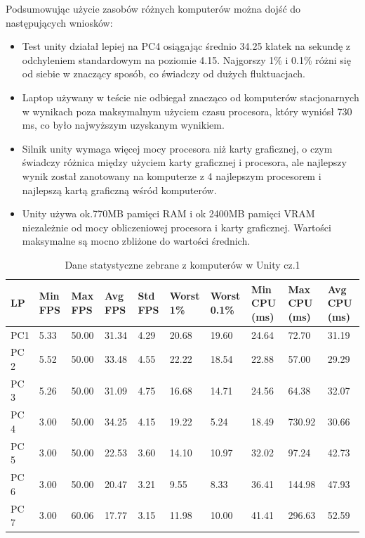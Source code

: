 \documentclass[12pt,twoside]{article}
\begin{document}
Podsumowując użycie zasobów różnych komputerów można dojść do następujących
wniosków:
\begin{itemize}
\item Test unity działał lepiej na PC4 osiągając średnio 34.25 klatek na sekundę
z odchyleniem standardowym  na poziomie 4.15. Najgorszy 1\% i 0.1\% różni się od
siebie w znaczący sposób, co świadczy od dużych fluktuacjach. 

\item Laptop używany w teście nie odbiegał znacząco od komputerów stacjonarnych
w wynikach poza maksymalnym użyciem czasu procesora, który wyniósł 730 ms, co
było najwyższym uzyskanym wynikiem. 

\item Silnik unity wymaga więcej mocy procesora niż karty graficznej, o czym
świadczy różnica między użyciem karty graficznej i procesora, ale najlepszy
wynik został zanotowany na komputerze z 4 najlepszym procesorem i najlepszą
kartą graficzną wśród komputerów. 

\item Unity używa ok.770MB pamięci RAM i ok 2400MB pamięci VRAM niezależnie od
mocy obliczeniowej procesora i karty graficznej. Wartości maksymalne są mocno
zbliżone do wartości średnich. 
\end{itemize}





\begin{table}[ht]
    \caption{Dane statystyczne zebrane z komputerów w Unity cz.1}
    \centering		
        \begin{tabular}{|p{1cm}|p{1cm}|p{1cm}|p{1cm}|p{1cm}|p{1cm}|p{1cm}|p{1cm}|p{}|p{1cm}|}	
            \hline
            LP & Min FPS & Max FPS & Avg FPS & Std FPS & Worst 1\% & Worst 0.1\% & Min CPU (ms) & Max CPU (ms)  & Avg CPU (ms) \\
            \hline
            PC1 & 5.33 & 50.00 & 31.34 & 4.29 & 20.68 & 19.60 & 24.64 & 72.70 & 31.19 \\
            \hline
            PC 2 & 5.52 & 50.00 & 33.48 & 4.55 & 22.22 & 18.54 & 22.88 & 57.00 & 29.29 \\
            \hline
            PC 3 & 5.26 & 50.00 & 31.09 & 4.75 & 16.68 & 14.71 & 24.56 & 64.38 & 32.07 \\
            \hline
            PC 4 & 3.00 & 50.00 & 34.25 & 4.15 & 19.22 & 5.24 & 18.49 & 730.92 & 30.66 \\
            \hline
            PC 5 & 3.00 & 50.00 & 22.53 & 3.60 & 14.10 & 10.97 & 32.02 & 97.24 & 42.73 \\
            \hline
            PC 6 & 3.00 & 50.00 & 20.47 & 3.21 & 9.55 & 8.33 & 36.41 & 144.98 & 47.93 \\
            \hline
            PC 7 & 3.00 & 60.06 & 17.77 & 3.15 & 11.98 & 10.00 & 41.41 & 296.63 & 52.59 \\
            \hline
        \end{tabular}	
    \label{Tabela:StatystykiUnity1}
\end{table}	
\end{document}

